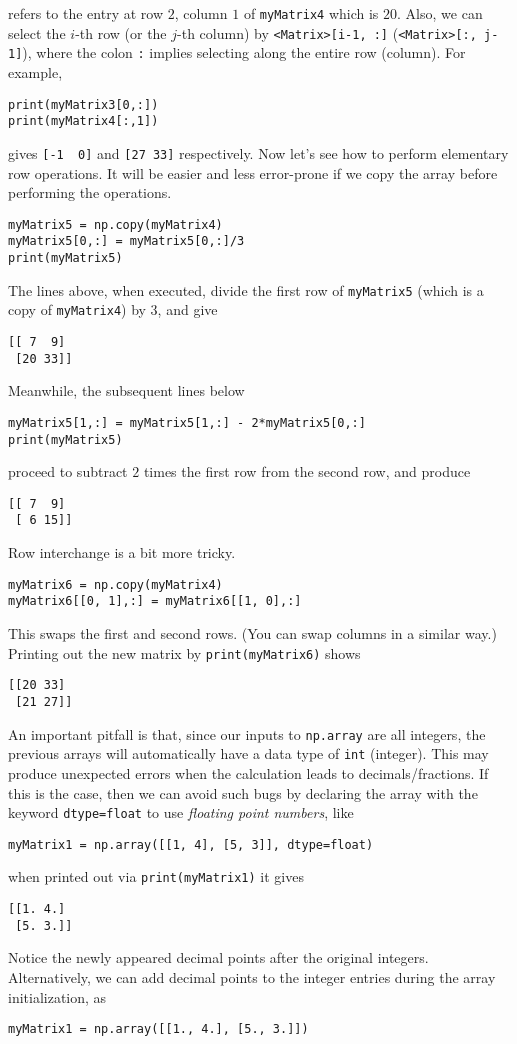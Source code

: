 refers to the entry at row $2$, column $1$ of \verb|myMatrix4| which is $20$. Also, we can select the $i$-th row (or the $j$-th column) by \verb|<Matrix>[i-1, :]| (\verb|<Matrix>[:, j-1]|), where the colon \verb|:| implies selecting along the entire row (column). For example,
\begin{lstlisting}
print(myMatrix3[0,:])
print(myMatrix4[:,1])
\end{lstlisting}
gives
\verb|[-1  0]| and \verb|[27 33]| respectively. Now let's see how to perform elementary row operations. It will be easier and less error-prone if we copy the array before performing the operations.
\begin{lstlisting}
myMatrix5 = np.copy(myMatrix4)
myMatrix5[0,:] = myMatrix5[0,:]/3
print(myMatrix5)
\end{lstlisting}
The lines above, when executed, divide the first row of \verb|myMatrix5| (which is a copy of \verb|myMatrix4|) by $3$, and give
\begin{lstlisting}
[[ 7  9]
 [20 33]]    
\end{lstlisting}
Meanwhile, the subsequent lines below
\begin{lstlisting}
myMatrix5[1,:] = myMatrix5[1,:] - 2*myMatrix5[0,:]
print(myMatrix5)
\end{lstlisting}
proceed to subtract $2$ times the first row from the second row, and produce
\begin{lstlisting}
[[ 7  9]
 [ 6 15]]
\end{lstlisting}
Row interchange is a bit more tricky.
\begin{lstlisting}
myMatrix6 = np.copy(myMatrix4)
myMatrix6[[0, 1],:] = myMatrix6[[1, 0],:]    
\end{lstlisting}
This swaps the first and second rows. (You can swap columns in a similar way.) Printing out the new matrix by \verb|print(myMatrix6)| shows
\begin{lstlisting}
[[20 33]
 [21 27]]
\end{lstlisting}
An important pitfall is that, since our inputs to \texttt{np.array} are all integers, the previous arrays will automatically have a data type of \texttt{int} (integer). This may produce unexpected errors when the calculation leads to decimals/fractions. If this is the case, then we can avoid such bugs by declaring the array with the keyword \verb|dtype=float| to use \textit{floating point numbers}, like
\begin{lstlisting}
myMatrix1 = np.array([[1, 4], [5, 3]], dtype=float) 
\end{lstlisting}
when printed out via \verb|print(myMatrix1)| it gives
\begin{lstlisting}
[[1. 4.]
 [5. 3.]]    
\end{lstlisting}
Notice the newly appeared decimal points after the original integers. Alternatively, we can add decimal points to the integer entries during the array initialization, as
\begin{lstlisting}
myMatrix1 = np.array([[1., 4.], [5., 3.]]) 
\end{lstlisting}

